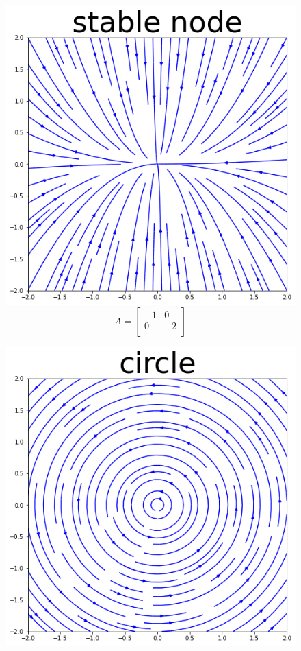 \documentclass[a0]{a0poster}
\begin{document}
\begin{textblock}{7.0}
\begin{figure}[h]
\begin{center}
\begin{minipage}[h]{0.27\linewidth}
\includegraphics[width=1\linewidth]{figures/stable_node1.png}
$$ A = \begin{bmatrix}
-1 & 0 \\
0 & -2 \\
\end{bmatrix}
$$
\end{minipage}
\hfill
\begin{minipage}[h]{0.27\linewidth}
\includegraphics[width=1\linewidth]{figures/cirle1.png}

\end{minipage}
\end{center}
\end{figure}
\end{textblock}
\end{document}

